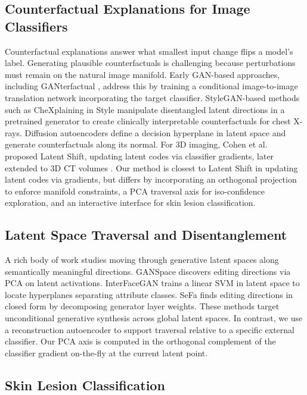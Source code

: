 \documentclass[conference,compsoc]{IEEEtran}
\begin{document}
\subsection{Counterfactual Explanations for Image Classifiers}

Counterfactual explanations answer what smallest input change flips a model's label. Generating plausible counterfactuals is challenging because perturbations must remain on the natural image manifold. Early GAN-based approaches, including GANterfactual \cite{ganterfactual}, address this by training a conditional image-to-image translation network incorporating the target classifier. StyleGAN-based methods such as CheXplaining in Style \cite{chexstyle} manipulate disentangled latent directions in a pretrained generator to create clinically interpretable counterfactuals for chest X-rays. Diffusion autoencoders \cite{daecf} define a decision hyperplane in latent space and generate counterfactuals along its normal. For 3D imaging, Cohen et al.\ \cite{latentshift} proposed Latent Shift, updating latent codes via classifier gradients, later extended to 3D CT volumes \cite{ct3d}. Our method is closest to Latent Shift in updating latent codes via gradients, but differs by incorporating an orthogonal projection to enforce manifold constraints, a PCA traversal axis for iso-confidence exploration, and an interactive interface for skin lesion classification.

\subsection{Latent Space Traversal and Disentanglement}

A rich body of work studies moving through generative latent spaces along semantically meaningful directions. GANSpace \cite{ganspace} discovers editing directions via PCA on latent activations. InterFaceGAN \cite{interfacegan} trains a linear SVM in latent space to locate hyperplanes separating attribute classes. SeFa \cite{sefa} finds editing directions in closed form by decomposing generator layer weights. These methods target unconditional generative synthesis across global latent spaces. In contrast, we use a reconstruction autoencoder to support traversal relative to a specific external classifier. Our PCA axis is computed in the orthogonal complement of the classifier gradient on-the-fly at the current latent point.

\subsection{Skin Lesion Classification}
\end{document}
